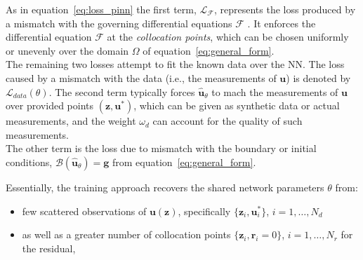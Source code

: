 \documentclass[pdflatex,sn-basic]{sn-jnl}%
\theoremstyle{thmstyleone}%
\theoremstyle{thmstyletwo}%
\theoremstyle{thmstylethree}%
\begin{document}
As in equation~\eqref{eq:loss_pinn} the first term, $\mathcal{L}_\mathcal{F}$, represents the loss produced by a mismatch with the governing differential equations $\mathcal{F}$ \citep{He2020_PhysicsInformedNeural_BarHBTT, Sti2020_LargeScaleNeural_BetSBB}.
It enforces the differential equation $\mathcal{F}$ at the \emph{collocation points}, which can be chosen uniformly or unevenly over the domain $\Omega$ of equation~\eqref{eq:general_form}.
\\
\noindent
The remaining two losses attempt to fit the known data over the NN.
The loss caused by a mismatch with the data (i.e., the measurements of $\bm{u}$) is denoted by $\mathcal{L}_{data} (\theta)$.
%
The second term typically forces $\hat{\bm{u}}_\theta$ to mach the measurements of $\bm{u}$ over provided points $(\bm{z}, \bm{u}^*)$, which can be given as synthetic data or actual measurements, and the weight $\omega_d$ can account for the quality of such measurements.
\\
\noindent
The other term is the loss due to mismatch with the boundary or initial conditions, $\mathcal{B} (\hat{\bm{u}}_\theta) = \bm{g}$ from equation~\eqref{eq:general_form}.
%



Essentially, the training approach recovers the shared network parameters $\theta$ from:
\begin{itemize}
    \item few scattered observations of $\bm{u}(\bm{z})$, specifically $\{\bm{z}_{i}, \bm{u}_i^*\}$, $i = 1,\dots,N_d$
    \item as well as a greater number of collocation points $\{\bm{z}_{i}, \bm{r}_i = 0\}$, $i = 1,\dots,N_r$ for the residual,
\end{itemize}
\end{document}
